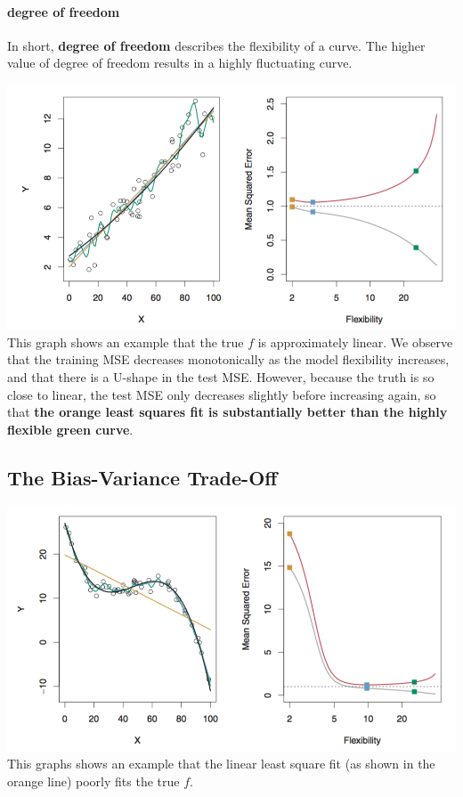 \documentclass{article}
\begin{document}
\paragraph{degree of freedom}
In short, \textbf{degree of freedom} describes the flexibility of a curve. The higher value of degree of freedom results in a highly fluctuating curve.

\includegraphics[scale=0.8]{images/flexibility_vs_mse.png} \\
This graph shows an example that the true $f$ is approximately linear. We observe that the training MSE decreases monotonically as the model flexibility increases, and that there is a U-shape in the test MSE. However, because the truth is so close to linear, the test MSE only decreases slightly before increasing again, so that \textbf{the orange least squares fit is substantially better than the highly flexible green curve}.

\subsection{The Bias-Variance Trade-Off}
\includegraphics[scale=0.8]{images/linear_poorly_fits.png} \\
This graphs shows an example that the linear least square fit (as shown in the orange line) poorly fits the true $f$.
\end{document}

